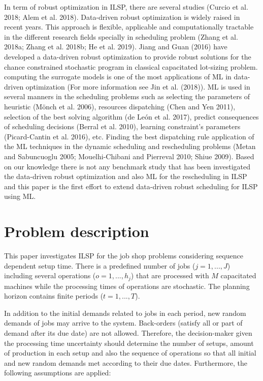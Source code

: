 \documentclass[letterpaper]{article} %
\begin{document}
In term of robust optimization in ILSP, there are  several studies (Curcio et al. 2018; Alem et al. 2018). Data-driven robust optimization is widely raised in recent years. This approach is flexible, applicable and computationally tractable in the different research fields specially in scheduling problem (Zhang et al. 2018a; Zhang et al. 2018b; He et al. 2019). Jiang and Guan (2016) have developed a data-driven robust optimization to provide robust solutions for the chance constrained stochastic program in classical capacitated lot-sizing problem.
computing the surrogate models is one of the most applications of ML in data-driven optimization (For more information see Jin et al. (2018)). ML is used in several manners in the scheduling problems such as selecting the parameters of heuristic (Mönch et al. 2006), resources dispatching (Chen and Yen 2011), selection of the best solving algorithm (de León et al. 2017), predict consequences of scheduling decisions (Berral et al. 2010), learning constraint's parameters (Picard-Cantin et al. 2016), etc. Finding the best dispatching rule application of the ML techniques in the dynamic scheduling and rescheduling problems (Metan and Sabuncuoglu 2005; Mouelhi-Chibani and Pierreval 2010; Shiue 2009). Based on our knowledge there is not any benchmark study that has been investigated the data-driven robust optimization and also ML for the rescheduling in ILSP and this paper is the first effort to extend data-driven robust scheduling for ILSP using ML.

\section{Problem description}
This paper investigates ILSP  for the job shop problems considering sequence dependent setup time. There is a predefined number of jobs ($j=1,...,J$) including several operations ($o=1,...,h_{j}$) that  are processed with $M$ capacitated machines while the processing times of operations are stochastic. The planning horizon contains finite periods ($t=1,...,T$).

In addition  to the initial demands related to jobs in each period, new random demands of jobs may arrive to the system. Back-orders (satisfy all or part of demand after its due date)  are not allowed. Therefore, the decision-maker given the processing time uncertainty should determine the number of setups, amount of production in each setup and also the sequence of operations so that all initial and new random demands met according to their due dates. Furthermore, the following assumptions are applied:
\end{document}
